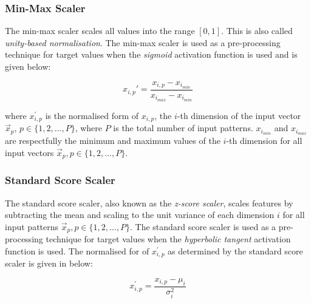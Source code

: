 \subsubsection{Min-Max Scaler}
\label{sec:anns:an:input:min_max_scaler}

The min-max scaler scales all values into the range
$[0,1]$. This is also called \textit{unity-based normalisation}. The
min-max scaler is used as a pre-processing technique for
target values when the \textit{sigmoid}  activation function is used and is given below:

\begin{equation}
    x_{i,p}'  = \frac{x_{i,p} - x_{i_{min}}}{x_{i_{max}} - x_{i_{min}}}
    \label{eq:min_max_scaler}
\end{equation}

\noindent where $x_{i,p}^{'}$ is the normalised form of $x_{i,p}$, the $i$-th
dimension of the input vector $\vec{x}_p$, $p \in \{1,2, \dots, P \}$, where $P$
is the total number of input patterns. $x_{i_{min}}$ and $x_{i_{max}}$ are
respectfully the minimum and maximum values of the $i$-th dimension for all
input vectors $\vec{x}_p, p \in \{1,2, \dots, P\}$.

\subsubsection{Standard Score Scaler}
\label{sec:anns:an:input:standard_score_scaler}

The standard score scaler, also known as the
\textit{z-score scaler}, scales features by subtracting
the mean and scaling to the unit variance of each dimension $i$ for all input
patterns $\vec{x}_p, p \in \{1,2, \dots, P\}$. The standard score scaler is used as a pre-processing technique for target
values when the \textit{hyperbolic tangent}
activation function is
used. The normalised for of $x_{i,p}^{'}$ as determined by the standard score scaler is given in below: 

\begin{equation}
    x_{i,p}^{'} = \frac{x_{i,p} - \mu_i}{\sigma^2_i}
    \label{eq:standard_score_scaler}
\end{equation}

